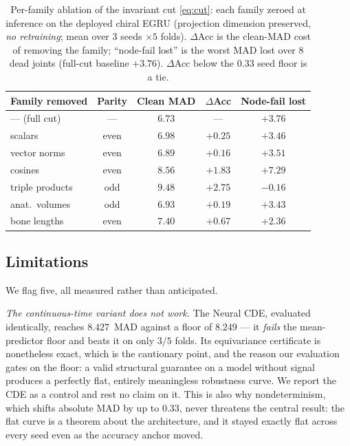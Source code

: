 \documentclass[10pt,journal]{IEEEtran}
\begin{document}
\begin{table}[!t]
\centering
\caption{Per-family ablation of the invariant cut \eqref{eq:cut}: each family zeroed at inference on
the deployed chiral EGRU (projection dimension preserved, \emph{no retraining}; mean over $3$ seeds
$\times5$ folds). $\Delta$Acc is the clean-MAD cost of removing the family; ``node-fail lost'' is the
worst MAD lost over $8$ dead joints (full-cut baseline $+3.76$). $\Delta$Acc below the $0.33$ seed
floor is a tie.}
\label{tab:ablation}
\scriptsize
\setlength{\tabcolsep}{4pt}
\begin{tabular}{lcccc}
\toprule
Family removed & Parity & Clean MAD & $\Delta$Acc & Node-fail lost \\
\midrule
--- (full cut)   & ---   & $6.73$ & ---            & $+3.76$ \\
scalars          & even  & $6.98$ & $+0.25$        & $+3.46$ \\
vector norms     & even  & $6.89$ & $+0.16$        & $+3.51$ \\
cosines          & even  & $8.56$ & $\mathbf{+1.83}$ & $\mathbf{+7.29}$ \\
triple products  & odd   & $9.48$ & $\mathbf{+2.75}$ & $-0.16$ \\
anat.\ volumes   & odd   & $6.93$ & $+0.19$        & $+3.43$ \\
bone lengths     & even  & $7.40$ & $+0.67$        & $+2.36$ \\
\bottomrule
\end{tabular}
\end{table}

\subsection{Limitations}
\label{sec:results:limits}

We flag five, all measured rather than anticipated.

\emph{The continuous-time variant does not work.} The Neural CDE, evaluated identically, reaches
$8.427$~MAD against a floor of $8.249$ --- it \emph{fails} the mean-predictor floor and beats it on
only $3/5$ folds. Its equivariance certificate is nonetheless exact, which is the cautionary point,
and the reason our evaluation gates on the floor: a valid structural guarantee on a model without
signal produces a perfectly flat, entirely meaningless robustness curve. We report the CDE as a
control and rest no claim on it. This is also why nondeterminism, which shifts absolute MAD by up to
$0.33$, never threatens the central result: the flat curve is a theorem about the architecture, and
it stayed exactly flat across every seed even as the accuracy anchor moved.
\end{document}
